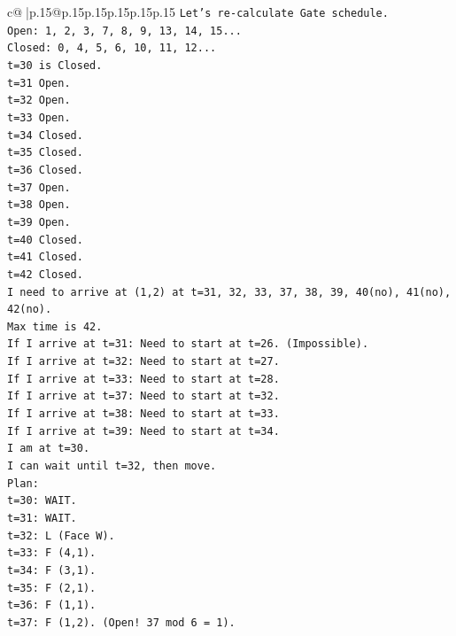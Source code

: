 \documentclass{article}
\begin{document}
{\begin{supertabular}{c@{$\;$}|p{.15\linewidth}@{}p{.15\linewidth}p{.15\linewidth}p{.15\linewidth}p{.15\linewidth}p{.15\linewidth}}
{{{\texttt{Let's re{-}calculate Gate schedule.} \\
\texttt{Open: 1, 2, 3, 7, 8, 9, 13, 14, 15...} \\
\texttt{Closed: 0, 4, 5, 6, 10, 11, 12...} \\
\texttt{t=30 is Closed.} \\
\texttt{t=31 Open.} \\
\texttt{t=32 Open.} \\
\texttt{t=33 Open.} \\
\texttt{t=34 Closed.} \\
\texttt{t=35 Closed.} \\
\texttt{t=36 Closed.} \\
\texttt{t=37 Open.} \\
\texttt{t=38 Open.} \\
\texttt{t=39 Open.} \\
\texttt{t=40 Closed.} \\
\texttt{t=41 Closed.} \\
\texttt{t=42 Closed.} \\
\texttt{I need to arrive at (1,2) at t=31, 32, 33, 37, 38, 39, 40(no), 41(no), 42(no).} \\
\texttt{Max time is 42.} \\
\texttt{If I arrive at t=31: Need to start at t=26. (Impossible).} \\
\texttt{If I arrive at t=32: Need to start at t=27.} \\
\texttt{If I arrive at t=33: Need to start at t=28.} \\
\texttt{If I arrive at t=37: Need to start at t=32.} \\
\texttt{If I arrive at t=38: Need to start at t=33.} \\
\texttt{If I arrive at t=39: Need to start at t=34.} \\
\texttt{I am at t=30.} \\
\texttt{I can wait until t=32, then move.} \\
\texttt{Plan:} \\
\texttt{t=30: WAIT.} \\
\texttt{t=31: WAIT.} \\
\texttt{t=32: L (Face W).} \\
\texttt{t=33: F (4,1).} \\
\texttt{t=34: F (3,1).} \\
\texttt{t=35: F (2,1).} \\
\texttt{t=36: F (1,1).} \\
\texttt{t=37: F (1,2). (Open! 37 mod 6 = 1).} \\
}}}
\end{supertabular}}
\end{document}
